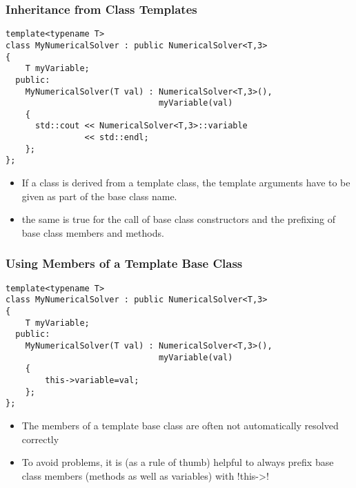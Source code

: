 
\begin{frame}[fragile]
\frametitle{Inheritance from Class Templates}
\begin{lstlisting}
template<typename T>
class MyNumericalSolver : public NumericalSolver<T,3>
{
    T myVariable;
  public:
    MyNumericalSolver(T val) : NumericalSolver<T,3>(),
                               myVariable(val)
    {
      std::cout << NumericalSolver<T,3>::variable
                << std::endl;
    };
};
\end{lstlisting}
\begin{itemize}%
\item If a class is derived from a template class, the template arguments have to be given as
part of the base class name.
\item the same is true for the call of base class constructors and the prefixing
of base class members and methods.
\end{itemize}

\end{frame}



\begin{frame}[fragile]
\frametitle{Using Members of a Template Base Class}
\begin{lstlisting}
template<typename T>
class MyNumericalSolver : public NumericalSolver<T,3>
{
    T myVariable;
  public:
    MyNumericalSolver(T val) : NumericalSolver<T,3>(),
                               myVariable(val)
    {
        this->variable=val;
    };
};
\end{lstlisting}
\begin{itemize}
\item The members of a template base class are often not automatically resolved correctly
\item To avoid problems, it is (as a rule of thumb) helpful to always prefix
base class members (methods as well as variables) with \inline!this->!
\end{itemize}

\end{frame}



